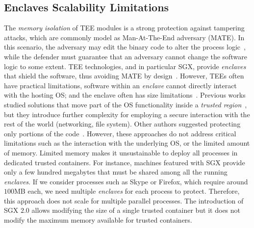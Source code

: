 

\subsection{Enclaves Scalability Limitations}
\label{ssec:contribution1}

The \emph{memory isolation} of TEE modules is a strong protection against 
tampering attacks, which are commonly model as Man-At-The-End adversary (MATE).
In this scenario, the adversary may edit the binary code to alter the process 
logic~\citep{AKHUNZADA201544}, while the defender must guarantee that an 
adversary cannot change the software logic to some extent. 
TEE technologies, and in particular SGX, provide \emph{enclaves} 
that shield the software, thus avoiding MATE by design~\citep{costan2016intel}.
However, TEEs often have practical limitations, \eg software within an 
\emph{enclave} cannot directly interact with the hosting OS; and the enclave 
often has size limitations~\citep{baumann2015shielding}.
Previous works studied solutions that move part of the OS functionality inside 
a \emph{trusted 
region}~\citep{baumann2015shielding,arnautov2016scone,tsai2017graphene},
but they introduce further complexity for employing a secure interaction with 
the rest of the world (\eg networking, file system).
Other authors suggested protecting only portions of the 
code~\cite{schuster2015vc3,lind2017glamdring}.
However, these approaches do not address critical limitations such as the 
interaction with the underlying OS, or the limited amount of memory.
Limited memory makes it unsustainable to deploy all processes in dedicated 
trusted containers.
For instance, machines featured with SGX provide only a few hundred megabytes 
that must be shared among all the running \emph{enclaves}.
If we consider processes such as Skype or Firefox, which require around 
$100$MB each, we need multiple \emph{enclaves} for each process to protect.
Therefore, this approach does not scale for multiple parallel processes.
The introduction of SGX $2.0$ allows modifying the size of a single trusted 
container but it does not modify the maximum memory available for trusted 
containers.

